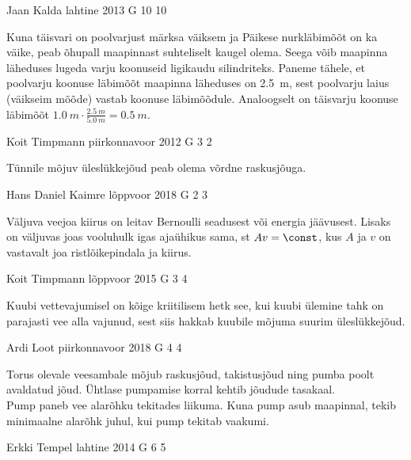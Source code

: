 \documentclass[11pt]{article}
\begin{document}
{%
{Jaan Kalda} %
{lahtine} %
{2013} %
{G 10} %
{10} %
{

\ifHint
Kuna täisvari on poolvarjust märksa väiksem ja Päikese nurkläbimõõt on ka väike, peab õhupall maapinnast suhteliselt kaugel olema. Seega võib maapinna läheduses lugeda varju koonuseid ligikaudu silindriteks. Paneme tähele, et poolvarju koonuse läbimõõt maapinna läheduses on \SI{2,5}{m}, sest poolvarju laius (väikseim mõõde) vastab koonuse läbimõõdule. Analoogselt on täisvarju koonuse läbimõõt $\SI{1,0}{m}\cdot\frac{\SI{2,5}{m}}{\SI{5,0}{m}} = \SI{0,5}{m}$.
\fi
}

{Koit Timpmann} %
{piirkonnavoor} %
{2012} %
{G 3} %
{2} %
{

\ifHint
Tünnile mõjuv üleslükkejõud peab olema võrdne raskusjõuga.
\fi
}

{Hans Daniel Kaimre} %
{lõppvoor} %
{2018} %
{G 2} %
{3} %
{

\ifHint
Väljuva veejoa kiirus on leitav Bernoulli seadusest või energia jäävusest. Lisaks on väljuvas joas vooluhulk igas ajaühikus sama, st $Av = \const$, kus $A$ ja $v$ on vastavalt joa ristlõikepindala ja kiirus.
\fi
}

{Koit Timpmann} %
{lõppvoor} %
{2015} %
{G 3} %
{4} %
{

\ifHint
Kuubi vettevajumisel on kõige kriitilisem hetk see, kui kuubi ülemine tahk on parajasti vee alla vajunud, sest siis hakkab kuubile mõjuma suurim üleslükkejõud.
\fi
}

{Ardi Loot} %
{piirkonnavoor} %
{2018} %
{G 4} %
{4} %
{

\ifHint
\osa Torus olevale veesambale mõjub raskusjõud, takistusjõud ning pumba poolt avaldatud jõud. Ühtlase pumpamise korral kehtib jõudude tasakaal.\\
\osa Pump paneb vee alarõhku tekitades liikuma. Kuna pump asub maapinnal, tekib minimaalne alarõhk juhul, kui pump tekitab vaakumi.
\fi
}

{Erkki Tempel} %
{lahtine} %
{2014} %
{G 6} %
{5} %
{

}}
\end{document}
